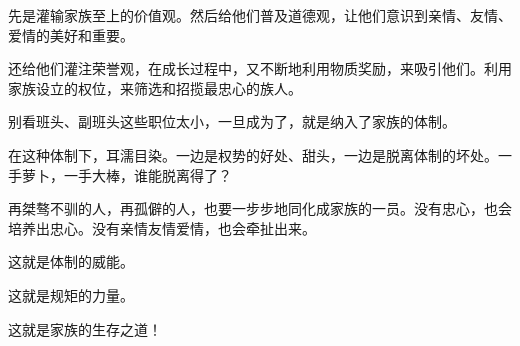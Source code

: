 \begin{this_body}
先是灌输家族至上的价值观。然后给他们普及道德观，让他们意识到亲情、友情、爱情的美好和重要。

还给他们灌注荣誉观，在成长过程中，又不断地利用物质奖励，来吸引他们。利用家族设立的权位，来筛选和招揽最忠心的族人。

别看班头、副班头这些职位太小，一旦成为了，就是纳入了家族的体制。

在这种体制下，耳濡目染。一边是权势的好处、甜头，一边是脱离体制的坏处。一手萝卜，一手大棒，谁能脱离得了？

再桀骜不驯的人，再孤僻的人，也要一步步地同化成家族的一员。没有忠心，也会培养出忠心。没有亲情友情爱情，也会牵扯出来。

这就是体制的威能。

这就是规矩的力量。

这就是家族的生存之道！

\end{this_body}

